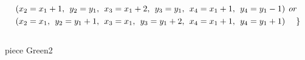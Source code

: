 \begin{align*}
&(x_{2} = x_{1}+1,\hspace{1ex}y_{2} = y_{1},\hspace{1ex}x_{3} = x_{1}+2, \hspace{1ex}y_{3} = y_{1},\hspace{1ex}x_{4} = x_{1}+1,\hspace{1ex}y_{4} = y_{1}-1)\hspace{1ex} or\\
&(x_{2} = x_{1},\hspace{1ex}y_{2} = y_{1}+1,\hspace{1ex}x_{3} = x_{1}, \hspace{1ex}y_{3} = y_{1}+2,\hspace{1ex}x_{4} = x_{1}+1,\hspace{1ex}y_{4} = y_{1}+1)\hspace{3ex} \}
\end{align*}
\\ piece Green2 
